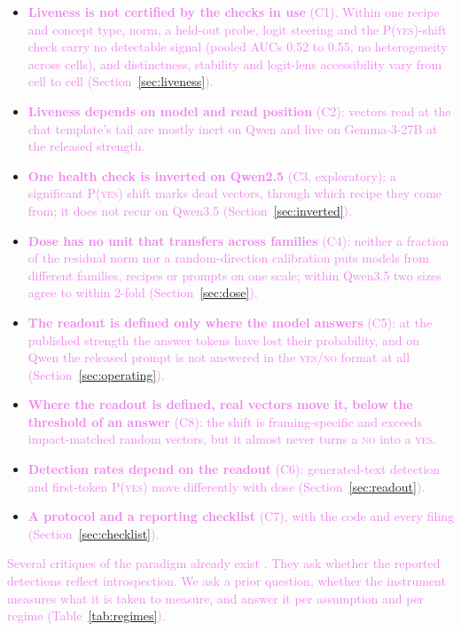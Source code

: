 \documentclass[11pt,a4paper]{article}
\newcommand{\pyes}{P(\textup{\textsc{yes}})}
\newcommand{\yes}{\textup{\textsc{yes}}}
\newcommand{\no}{\textup{\textsc{no}}}
\newcommand{\draft}[1]{\textcolor{violet}{#1}}
\begin{document}
\begin{itemize}
  \item \draft{\textbf{Liveness is not certified by the checks in use} (C1). Within one recipe and
  concept type, norm, a held-out probe, logit steering and the \pyes{}-shift check carry no
  detectable signal (pooled AUCs 0.52 to 0.55, no heterogeneity across cells), and distinctness, stability and logit-lens accessibility vary from cell
  to cell (Section~\ref{sec:liveness}).}
  \item \draft{\textbf{Liveness depends on model and read position} (C2): vectors read at the chat
  template's tail are mostly inert on Qwen and live on Gemma-3-27B at the released strength.}
  \item \draft{\textbf{One health check is inverted on Qwen2.5} (C3, exploratory): a significant
  \pyes{} shift marks dead vectors, through which recipe they come from; it does not recur on
  Qwen3.5 (Section~\ref{sec:inverted}).}
  \item \draft{\textbf{Dose has no unit that transfers across families} (C4): neither a fraction
  of the residual norm nor a random-direction calibration puts models from different families,
  recipes or prompts on one scale; within Qwen3.5 two sizes agree to within 2-fold
  (Section~\ref{sec:dose}).}
  \item \draft{\textbf{The readout is defined only where the model answers} (C5): at the published
  strength the answer tokens have lost their probability, and on Qwen the released prompt is not
  answered in the \yes{}/\no{} format at all (Section~\ref{sec:operating}).}
  \item \draft{\textbf{Where the readout is defined, real vectors move it, below the threshold of an
  answer} (C8): the shift is framing-specific and exceeds impact-matched random vectors, but it
  almost never turns a \no{} into a \yes{}.}
  \item \draft{\textbf{Detection rates depend on the readout} (C6): generated-text detection and
  first-token \pyes{} move differently with dose (Section~\ref{sec:readout}).}
  \item \draft{\textbf{A protocol and a reporting checklist} (C7), with the code and every filing
  (Section~\ref{sec:checklist}).}
\end{itemize}

\draft{Several critiques of the paradigm already exist
\citep{hahami2025disturbance,lederman2026contentagnostic,singh2026realitycheck,ferrara2026masked}.
They ask whether the reported detections reflect introspection. We ask a prior question, whether
the instrument measures what it is taken to measure, and answer it per assumption and per regime
(Table~\ref{tab:regimes}).}
\end{document}
